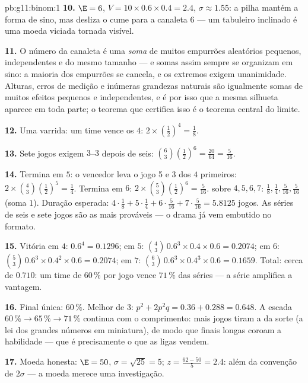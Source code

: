 \begin{solution}{pb:g11:binom:1}
\textbf{10.} $\E = 6$, $V = 10 \times 0.6 \times 0.4 = 2.4$,
$\sigma \approx 1.55$: a pilha mantém a forma de sino, mas
desliza o cume para a canaleta $6$ --- um tabuleiro inclinado é
uma moeda viciada tornada visível.

\textbf{11.} O número da canaleta é uma \emph{soma} de muitos
empurrões aleatórios pequenos, independentes e do mesmo
tamanho --- e somas assim sempre se organizam em sino: a
maioria dos empurrões se cancela, e os extremos exigem
unanimidade. Alturas, erros de medição e inúmeras grandezas
naturais são igualmente somas de muitos efeitos pequenos e
independentes, e é por isso que a mesma silhueta aparece em
toda parte; o teorema que certifica isso é o teorema central do
limite.

\textbf{12.} Uma varrida: um time vence os $4$:
$2 \times \left(\frac12\right)^4 = \frac18$.

\textbf{13.} Sete jogos exigem $3$--$3$ depois de seis:
$\binom63 \left(\frac12\right)^6 = \frac{20}{64} =
\frac{5}{16}$.

\textbf{14.} Termina em $5$: o vencedor leva o jogo 5 e $3$ dos
$4$ primeiros: $2 \times \binom43 \left(\frac12\right)^5 =
\frac14$. Termina em $6$:
$2 \times \binom53 \left(\frac12\right)^6 = \frac{5}{16}$.
 sobre $4, 5, 6, 7$:
$\frac18, \frac14, \frac{5}{16}, \frac{5}{16}$ (soma $1$).
Duração esperada: $4 \cdot \frac18 + 5 \cdot \frac14 + 6 \cdot
\frac{5}{16} + 7 \cdot \frac{5}{16} = 5.8125$ jogos. As séries
de seis e sete jogos são as mais prováveis --- o drama já vem
embutido no formato.

\textbf{15.} Vitória em $4$: $0.6^4 = 0.1296$; em $5$:
$\binom43\,0.6^3 \times 0.4 \times 0.6 = 0.2074$; em $6$:
$\binom53\,0.6^3 \times 0.4^2 \times 0.6 = 0.2074$; em $7$:
$\binom63\,0.6^3 \times 0.4^3 \times 0.6 = 0.1659$. Total:
cerca de $0.710$: um time de $60\,\%$ por jogo vence $71\,\%$
das séries --- a série amplifica a vantagem.

\textbf{16.} Final única: $60\,\%$. Melhor de 3:
$p^2 + 2p^2 q = 0.36 + 0.288 = 0.648$. A escada
$60\,\% \to 65\,\% \to 71\,\%$ continua com o comprimento: mais
jogos tiram a  da sorte (a lei dos grandes números em
miniatura), de modo que finais longas coroam a habilidade ---
que é precisamente o que as ligas vendem.

\textbf{17.} Moeda honesta: $\E = 50$,
$\sigma = \sqrt{25} = 5$; $z = \frac{62 - 50}{5} = 2.4$: além
da convenção de $2\sigma$ --- a moeda merece uma investigação.


\end{solution}
